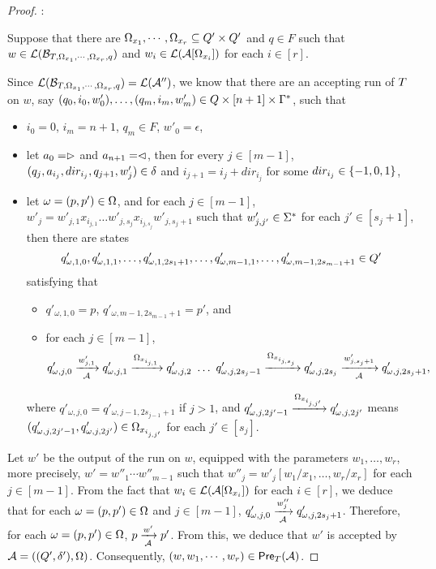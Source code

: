 \begin{proof}
\smallskip

: 

\smallskip

Suppose that there are $\Omega_{x_1},\cdots, \Omega_{x_r} \subseteq Q' \times Q'$ and $q \in F$ such that $w \in \mathcal{L}(\mathcal{B}_{T, \Omega_{x_1}, \cdots, \Omega_{x_r}, q})$ and $w_i \in \mathcal{L}(\mathcal{A}[\Omega_{x_i}])$ for each $i \in [r]$. 

Since $\mathcal{L}(\mathcal{B}_{T, \Omega_{x_1}, \cdots, \Omega_{x_r}, q})=\mathcal{L}(\mathcal{A}'')$, we know that  there are an accepting run of $T$ on $w$, 
say $(q_0, i_0, w'_0),\ldots, (q_m, i_m, w'_m) \in Q \times [n+1] \times \Gamma^*$, such that 
\begin{itemize}
\item $i_0=0$, $i_m = n+1$, $q_m \in F$, $w'_0 = \epsilon$,
%
\item let $a_0 = \vartriangleright$ and $a_{n+1} = \vartriangleleft$,  then for every $j \in [m-1]$, $(q_j, a_{i_j}, dir_{i_j}, q_{j+1}, w'_j) \in
        \delta$ and $i_{j+1} = i_j + dir_{i_j}$ for some $dir_{i_j} \in \{-1, 0, 1\}$, 
 \item  let $\omega =(p, p') \in \Omega$,  and for each $j \in [m-1]$, $w'_j = w'_{j, 1} x_{i_{j, 1}} \ldots w'_{j, s_j} x_{i_{j, s_j}} w'_{j, s_j + 1}$ such that $w'_{j, j'} \in \Sigma^*$ for each $j' \in [s_j+1]$, then there are states 
 $$q'_{\omega, 1, 0}, q'_{\omega, 1,1}, \ldots, q'_{\omega, 1, 2s_1 +1}, \ldots,  q'_{\omega, m-1, 1},  \ldots, q'_{\omega, m-1, 2s_{m-1} +1} \in Q'$$
 satisfying that 
 \begin{itemize}
\item $q'_{\omega, 1, 0} = p$, $q'_{\omega, m-1, 2s_{m-1} +1} = p'$, and 
%
\item for each $j \in [m-1]$, 
{\small
$$q'_{\omega, j, 0} \xrightarrow[\Aut]{w'_{j, 1} } q'_{\omega, j, 1} \xrightarrow{\conacc_{x_{i_{j, 1}}}} q'_{\omega, j, 2}\ \ldots\ q'_{\omega, j, 2s_j-1} \xrightarrow{\conacc_{x_{i_{j, s_j}}}} q'_{\omega, j, 2s_j} \xrightarrow[\Aut]{w'_{j, s_j + 1}} q'_{\omega, j, 2s_j+1},$$ 
}
\end{itemize}
where $q'_{\omega, j, 0} = q'_{\omega, j-1, 2s_{j-1}+1}$ if $j > 1$, and $q'_{\omega, j, 2j'-1} \xrightarrow{\Omega_{x_{i_{j, j'}}}} q'_{\omega, j, 2j'}$ means $(q'_{\omega, j, 2j'-1} , q'_{\omega, j, 2j'}) \in \Omega_{x_{i_{j, j'}}}$ for each $j' \in [s_j]$.
\end{itemize}

Let $w'$ be the output of the run on $w$, equipped with the parameters $w_1,\ldots, w_r$, more precisely, $w' = w''_1 \cdots w''_{m-1}$ such that  $w''_j = w'_j[w_1/x_1, \ldots, w_r/x_r]$ for each $j \in  [m-1]$. From the fact that $w_i \in \mathcal{L}(\mathcal{A}[\Omega_{x_i}])$ for each $i \in [r]$, we deduce that for each $\omega = (p,p') \in \Omega$ and $j \in [m-1]$, $q'_{\omega, j, 0} \xrightarrow[\mathcal{A}]{w''_j} q'_{\omega, j, 2s_j+1}$.
Therefore, for each $\omega = (p,p') \in \Omega$, $p \xrightarrow[\mathcal{A}]{w'} p'$. From this, we deduce that $w'$ is accepted by $\mathcal{A}=((Q', \delta'), \Omega)$.
Consequently, $(w, w_1,\cdots, w_r) \in \textsf{Pre}_{T}(\mathcal{A})$.
\end{proof}






